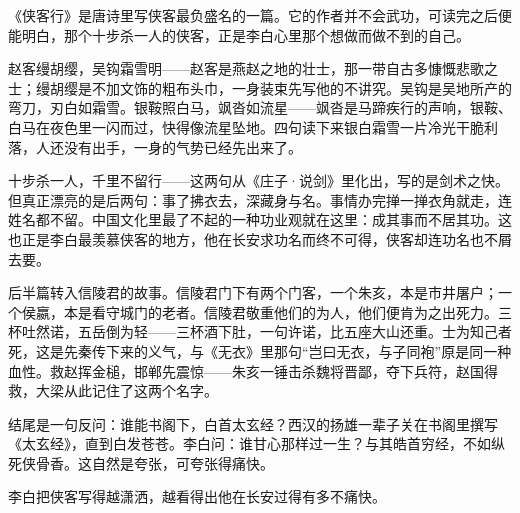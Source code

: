 \begin{appreciation}
《侠客行》是唐诗里写侠客最负盛名的一篇。它的作者并不会武功，可读完之后便能明白，那个十步杀一人的侠客，正是李白心里那个想做而做不到的自己。

赵客缦胡缨，吴钩霜雪明——赵客是燕赵之地的壮士，那一带自古多慷慨悲歌之士；缦胡缨是不加文饰的粗布头巾，一身装束先写他的不讲究。吴钩是吴地所产的弯刀，刃白如霜雪。银鞍照白马，飒沓如流星——飒沓是马蹄疾行的声响，银鞍、白马在夜色里一闪而过，快得像流星坠地。四句读下来银白霜雪一片冷光干脆利落，人还没有出手，一身的气势已经先出来了。

十步杀一人，千里不留行——这两句从《庄子·说剑》里化出，写的是剑术之快。但真正漂亮的是后两句：事了拂衣去，深藏身与名。事情办完掸一掸衣角就走，连姓名都不留。中国文化里最了不起的一种功业观就在这里：成其事而不居其功。这也正是李白最羡慕侠客的地方，他在长安求功名而终不可得，侠客却连功名也不屑去要。

后半篇转入信陵君的故事。信陵君门下有两个门客，一个朱亥，本是市井屠户；一个侯嬴，本是看守城门的老者。信陵君敬重他们的为人，他们便肯为之出死力。三杯吐然诺，五岳倒为轻——三杯酒下肚，一句许诺，比五座大山还重。士为知己者死，这是先秦传下来的义气，与《无衣》里那句“岂曰无衣，与子同袍”原是同一种血性。救赵挥金槌，邯郸先震惊——朱亥一锤击杀魏将晋鄙，夺下兵符，赵国得救，大梁从此记住了这两个名字。

结尾是一句反问：谁能书阁下，白首太玄经？西汉的扬雄一辈子关在书阁里撰写《太玄经》，直到白发苍苍。李白问：谁甘心那样过一生？与其皓首穷经，不如纵死侠骨香。这自然是夸张，可夸张得痛快。

李白把侠客写得越潇洒，越看得出他在长安过得有多不痛快。
\end{appreciation}
